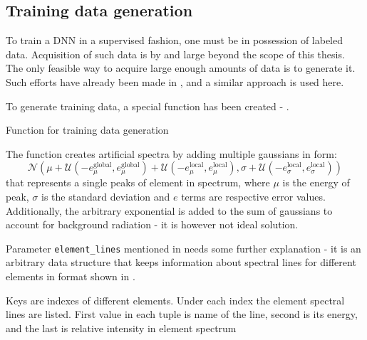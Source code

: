 \subsection{Training data generation}
To train a DNN in a supervised fashion, one must be in possession of labeled data. 
Acquisition of such data is by and large beyond the scope of this thesis. 
The only feasible way to acquire large enough amounts of data is to generate it. 
Such efforts have already been made in \cite{Jones2022}, and a similar approach is used here.

To generate training data, a special function has been created - . 

\newenvironment{longlistingD}{\captionsetup{type=listing, width=0.8\textwidth}}{}
\begin{longlistingD}
    \caption{Function for training data generation}
    \label{lst:data_generation}
\end{longlistingD}
\vspace{12pt}

The function creates artificial spectra by adding multiple gaussians in form: \[\mathcal{N}(\mu + \mathcal{U}(-e_\mu^{\text{global}}, e_\mu^{\text{global}}) + \mathcal{U}(-e_\mu^{\text{local}}, e_\mu^{\text{local}}), \sigma + \mathcal{U}(-e_\sigma^{\text{local}}, e_\sigma^{\text{local}}))\]
that represents a single peaks of element in spectrum, where $\mu$ is the energy of peak, $\sigma$ is the standard deviation and $e$ terms are respective error values. Additionally, the arbitrary exponential is added to the sum of gaussians to account for background radiation - it is however not ideal solution.

Parameter \texttt{element\_lines} mentioned in  needs some further explanation - it is an arbitrary data structure that keeps information about spectral lines for different elements in format shown in .

\newenvironment{longlistingE}{\captionsetup{type=listing, width=0.8\textwidth}}{}
\begin{longlistingE}
    \caption{Keys are indexes of different elements. Under each index the element spectral lines are listed. First value in each tuple is name of the line, second is its energy, and the last is relative intensity in element spectrum}
    \label{lst:element_lines}
\end{longlistingE}
\vspace{12pt}

